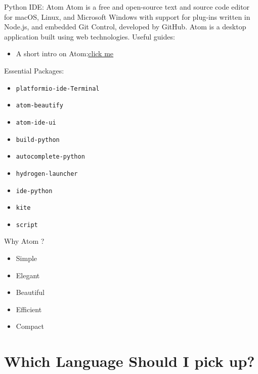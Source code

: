 \documentclass[handout]{beamer} %
\begin{document}
\begin{frame}{Python IDE: Atom}
	Atom is a free and open-source text and source code editor for macOS, Linux, and Microsoft Windows with support for plug-ins written in Node.js, and embedded Git Control, developed by GitHub. Atom is a desktop application built using web technologies. Useful guides:
	\begin{itemize}
		\item A short intro on Atom:\href{https://blog.atom.io/2017/09/12/announcing-atom-ide.html}{click me \Coffeecup}
	\end{itemize}
Essential Packages:
\begin{itemize}
	\item \texttt{platformio-ide-Terminal}
	\item \texttt{atom-beautify}
	\item \texttt{atom-ide-ui}
	\item \texttt{build-python}
	\item \texttt{autocomplete-python}
	\item \texttt{hydrogen-launcher}
	\item \texttt{ide-python}
	\item \texttt{kite}
	\item \texttt{script}
\end{itemize}
\end{frame}

\begin{frame}{Why Atom ?}
	\begin{itemize}
	\setlength\itemsep{1em}
		\item Simple 
		\item Elegant 
		\item Beautiful
		\item Efficient
		\item Compact
	\end{itemize}
\end{frame}

\section{Which Language Should I pick up?}
\end{document}
